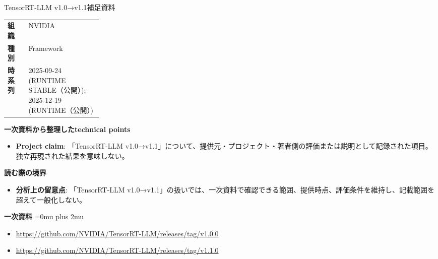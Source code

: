 \begin{technicalnote}{TensorRT-LLM v1.0→v1.1}{補足資料}
\begingroup
\begin{tabularx}{\linewidth}{@{}>{\bfseries}p{0.22\linewidth}X@{}}
組織 & NVIDIA \\
種別 & Framework \\
時系列 & 2025-09-24 (RUNTIME STABLE（公開）); 2025-12-19 (RUNTIME（公開）) \\
\end{tabularx}
\smallskip
{\bfseries 一次資料から整理したtechnical points}
\begin{itemize}[leftmargin=1.5em,itemsep=0.35em]
\item \textbf{Project claim}: 「TensorRT-LLM v1.0→v1.1」について、提供元・プロジェクト・著者側の評価または説明として記録された項目。独立再現された結果を意味しない。
\end{itemize}
\begin{minipage}{\linewidth}
{\bfseries 読む際の境界}
\begin{itemize}[leftmargin=1.5em,itemsep=0.35em]
\item \textbf{分析上の留意点}: 「TensorRT-LLM v1.0→v1.1」の扱いでは、一次資料で確認できる範囲、提供時点、評価条件を維持し、記載範囲を超えて一般化しない。
\end{itemize}
\begin{samepage}
{\bfseries 一次資料}
\begingroup\sloppy
\Urlmuskip=0mu plus 2mu\relax
\begin{itemize}[leftmargin=1.5em,itemsep=0.25em]
\item {\scriptsize\url{https://github.com/NVIDIA/TensorRT-LLM/releases/tag/v1.0.0}}
\item {\scriptsize\url{https://github.com/NVIDIA/TensorRT-LLM/releases/tag/v1.1.0}}
\end{itemize}
\endgroup
\end{samepage}
\end{minipage}
\endgroup
\end{technicalnote}
\medskip

